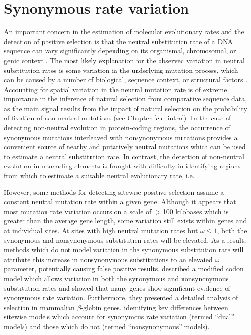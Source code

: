 \section{Synonymous rate variation}


An important concern in the estimation of molecular evolutionary rates
and the detection of positive selection is that the neutral
substitution rate of a DNA sequence can vary significantly depending
on its organismal, chromosomal, or genic context
\citep{Wolfe1987,Gaut1996,Hurst2001,Tuplin2002,Mugal2010}. The most
likely explanation for the observed variation in neutral substitution
rates is some variation in the underlying mutation process, which can
be caused by a number of biological, sequence context, or structural
factors \citep{Ellegren2003,Gaffney2005,Mugal2010}. Accounting for
spatial variation in the neutral mutation rate is of extreme
importance in the inference of natural selection from comparative
sequence data, as the main signal results from the impact of natural
selection on the probability of fixation of non-neutral mutations (see
Chapter \ref{ch_intro}). In the case of detecting non-neutral
evolution in protein-coding regions, the occurrence of synonymous
mutations interleaved with nonsynonymous mutations provides a
convenient source of nearby and putatively neutral mutations which can
be used to estimate a neutral substitution rate. In contrast, the
detection of non-neutral evolution in noncoding elements is fraught
with difficulty in identifying regions from which to estimate a
suitable neutral evolutionary rate, i.e.\ \citep{Taylor2008}.

However, some methods for detecting sitewise positive selection assume
a constant neutral mutation rate within a given gene. Although it
appears that most mutation rate variation occurs on a scale of $>$100
kilobases \citep{Gaffney2005} which is greater than the average gene
length, some variation still exists within genes and at individual
sites. At sites with high neutral mutation rates but $\omega\leq1$,
both the synonymous and nonsynonymous substitution rates will be
elevated. As a result, methods which do not model variation in the
synonymous substitution rate will attribute this increase in
nonsynonymous substitutions to an elevated $\omega$ parameter,
potentially causing false positive results. \citet{Pond2005b}
described a modified codon model which allows variation in both the
synonymous and nonsynonymous substitution rates and showed that many
genes show significant evidence of synonymous rate
variation. Furthermore, they presented a detailed analysis of
selection in mammalian $\beta$-globin genes, identifying key
differences between sitewise models which account for synonymous rate
variation (termed ``dual'' models) and those which do not (termed
``nonsynonymous'' models).

